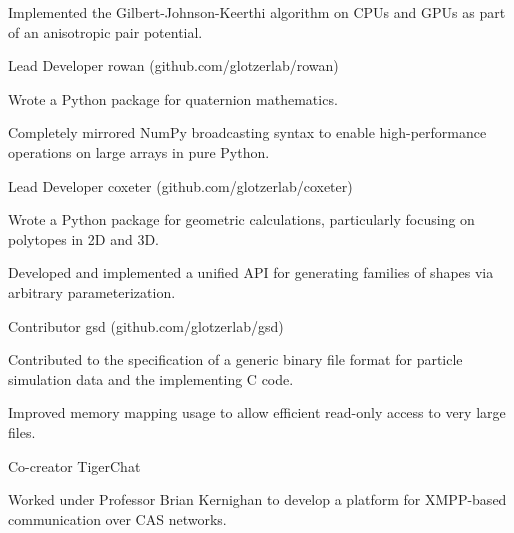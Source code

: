 \begin{cventries}
{\begin{cvitems}
        \item Implemented the Gilbert-Johnson-Keerthi algorithm on CPUs and GPUs as part of an anisotropic pair potential.
      \end{cvitems}
    }
\ifextended
  \cventry
    {Lead Developer} %
    {rowan ({\tiny github.com/glotzerlab/rowan})} %
    {} %
    {} %
    {
      \begin{cvitems} %
        \item Wrote a Python package for quaternion mathematics.
        \item Completely mirrored NumPy broadcasting syntax to enable high-performance operations on large arrays in pure Python.
      \end{cvitems}
    }
  \cventry
    {Lead Developer} %
    {coxeter ({\tiny github.com/glotzerlab/coxeter})} %
    {} %
    {} %
    {
      \begin{cvitems} %
        \item Wrote a Python package for geometric calculations, particularly focusing on polytopes in 2D and 3D.
        \item Developed and implemented a unified API for generating families of shapes via arbitrary parameterization.
      \end{cvitems}
    }
  \cventry
    {Contributor} %
    {gsd ({\tiny github.com/glotzerlab/gsd})} %
    {} %
    {} %
    {
      \begin{cvitems} %
        \item Contributed to the specification of a generic binary file format for particle simulation data and the implementing C code.
        \item Improved memory mapping usage to allow efficient read-only access to very large files.
      \end{cvitems}
    }
\fi
\ifoutdated
  \cventry
    {Co-creator} %
    {TigerChat} %
    {} %
    {} %
    {
      \begin{cvitems} %
      \item Worked under Professor Brian Kernighan to develop a platform for XMPP-based communication over CAS networks.
      \end{cvitems}
    }
\fi
\end{cventries}
